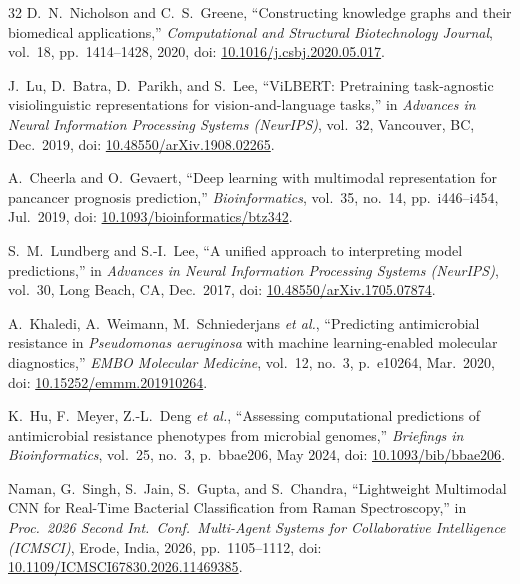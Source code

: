 \documentclass[conference]{IEEEtran}
\begin{document}
\begin{thebibliography}{32}
D.~N.~Nicholson and C.~S.~Greene,
``Constructing knowledge graphs and their biomedical applications,''
\textit{Computational and Structural Biotechnology Journal},
vol.~18, pp.~1414--1428, 2020,
doi: \href{https://doi.org/10.1016/j.csbj.2020.05.017}{10.1016/j.csbj.2020.05.017}.

J.~Lu, D.~Batra, D.~Parikh, and S.~Lee,
``ViLBERT: Pretraining task-agnostic visiolinguistic representations
for vision-and-language tasks,''
in \textit{Advances in Neural Information Processing Systems (NeurIPS)},
vol.~32, Vancouver, BC, Dec.\ 2019,
doi: \href{https://doi.org/10.48550/arXiv.1908.02265}{10.48550/arXiv.1908.02265}.

A.~Cheerla and O.~Gevaert,
``Deep learning with multimodal representation for pancancer prognosis prediction,''
\textit{Bioinformatics}, vol.~35, no.~14, pp.~i446--i454, Jul.\ 2019,
doi: \href{https://doi.org/10.1093/bioinformatics/btz342}{10.1093/bioinformatics/btz342}.

S.~M.~Lundberg and S.-I.~Lee,
``A unified approach to interpreting model predictions,''
in \textit{Advances in Neural Information Processing Systems (NeurIPS)},
vol.~30, Long Beach, CA, Dec.\ 2017,
doi: \href{https://doi.org/10.48550/arXiv.1705.07874}{10.48550/arXiv.1705.07874}.

A.~Khaledi, A.~Weimann, M.~Schniederjans \textit{et al.},
``Predicting antimicrobial resistance in \textit{Pseudomonas aeruginosa}
with machine learning-enabled molecular diagnostics,''
\textit{EMBO Molecular Medicine}, vol.~12, no.~3, p.~e10264, Mar.\ 2020,
doi: \href{https://doi.org/10.15252/emmm.201910264}{10.15252/emmm.201910264}.

K.~Hu, F.~Meyer, Z.-L.~Deng \textit{et al.},
``Assessing computational predictions of antimicrobial resistance
phenotypes from microbial genomes,''
\textit{Briefings in Bioinformatics}, vol.~25, no.~3, p.~bbae206, May 2024,
doi: \href{https://doi.org/10.1093/bib/bbae206}{10.1093/bib/bbae206}.

Naman, G.~Singh, S.~Jain, S.~Gupta, and S.~Chandra,
``Lightweight Multimodal CNN for Real-Time Bacterial Classification
from Raman Spectroscopy,''
in \textit{Proc.\ 2026 Second Int.\ Conf.\ Multi-Agent Systems
for Collaborative Intelligence (ICMSCI)},
Erode, India, 2026, pp.~1105--1112,
doi: \href{https://doi.org/10.1109/ICMSCI67830.2026.11469385}{10.1109/ICMSCI67830.2026.11469385}.


\end{thebibliography}
\end{document}
